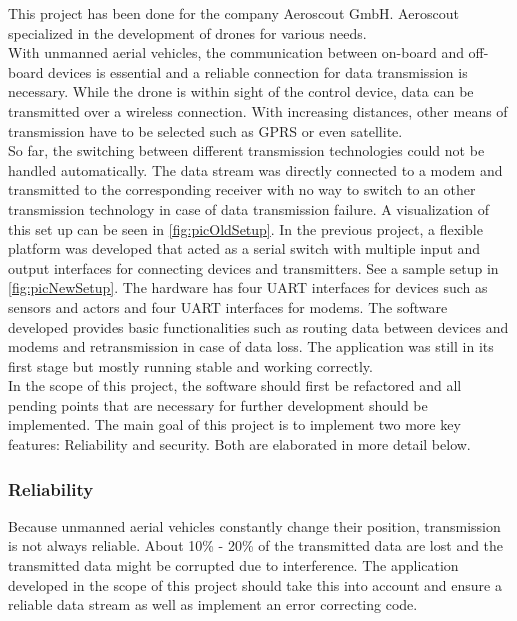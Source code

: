 %
\label{sec:txtAufgabenstellung}
This project has been done for the company Aeroscout GmbH. Aeroscout specialized in the development of drones for various needs. \\
With unmanned aerial vehicles, the communication between on-board and off-board devices is essential and a reliable connection for data transmission is necessary. While the drone is within sight of the control device, data can be transmitted over a wireless connection. With increasing distances, other means of transmission have to be selected such as GPRS or even satellite.\\
So far, the switching between different transmission technologies could not be handled automatically. The data stream was directly connected to a modem and transmitted to the corresponding receiver with no way to switch to an other transmission technology in case of data transmission failure. A visualization of this set up can be seen in \autoref{fig:picOldSetup}.
%
%
In the previous project, a flexible platform was developed that acted as a serial switch with multiple input and output interfaces for connecting devices and transmitters. See a sample setup in \autoref{fig:picNewSetup}. The hardware has four UART interfaces for devices such as sensors and actors and four UART interfaces for modems. The software developed provides basic functionalities such as routing data between devices and modems and retransmission in case of data loss. The application was still in its first stage but mostly running stable and working correctly.\\
In the scope of this project, the software should first be refactored and all pending points that are necessary for further development should be implemented. The main goal of this project is to implement two more key features: Reliability and security. Both are elaborated in more detail below.
%
\subsubsection{Reliability}
Because unmanned aerial vehicles constantly change their position, transmission is not always reliable. About 10\% - 20\% of the transmitted data are lost and the transmitted data might be corrupted due to interference. The application developed in the scope of this project should take this into account and ensure a reliable data stream as well as implement an error correcting code.
%
